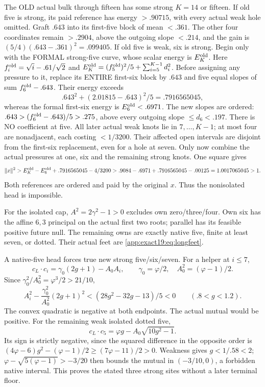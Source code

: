 The OLD actual bulk through fifteen
has some strong \(K=14\) or fifteen.
If old five is strong, its paid
reference has energy \(>.90715\),
with every actual weak hole omitted.
Graft
\(.643\) into its first-five block
of mean \(<.361\).
The other four coordinates remain
\(>.2904\), above the outgoing
slope \(<.214\), and the gain is
\((5/4)(.643-.361)^2=.099405\).
If old five is weak, six is strong.
Begin only with the FORMAL
strong-five curve, whose scalar
energy is \(E_K^{\rm old}\).
Here \(f_i^{\rm old}=\sqrt i-.61/\sqrt2\)
and \(E_K^{\rm old}=(f_5^{\rm old})^2/5
+\sum_{i=5}^{K-1}d_i^2\).
Before assigning any pressure to
it, replace its ENTIRE first-six
block by \(.643\) and five equal
slopes of sum \(f_6^{\rm old}-.643\).
Their energy exceeds
\[
 .643^2+(2.01815-.643)^2/5=.7916565045 ,
\]
whereas the formal first-six
energy is \(E_6^{\rm old}<.6971\).
The new slopes are ordered:
\(.643>(f_6^{\rm old}-.643)/5>.275\),
above every outgoing slope
\(\le d_6<.197\).
There is NO coefficient at five.
All later actual weak knots lie
in \(7,\ldots,K-1\); at most four
are nonadjacent, each costing
\(<1/3200\).
Their affected open intervals
are disjoint from the first-six
replacement, even for a hole
at seven.
Only now combine the actual
pressures at one, six and the
remaining strong knots.
One square gives
\[
 \|x\|^2>
 E_K^{\rm old}-E_6^{\rm old}
      +.7916565045-4/3200
 >.9084-.6971+.7916565045-.00125
       =1.0017065045>1 .
\]
Both references are ordered and
paid by the original \(x\).
Thus the nonisolated head is
impossible.

For the isolated cap,
\(A^2=2\gamma^2-1>0\) excludes
own zero/three/four.
Own six has the affine \(6,3\)
principal on the actual first two
roots; parallel has its feasible
positive future null.
The remaining owns are exactly
native five, finite at least seven,
or dotted.
Their actual feet are
\eqref{app:exact19:eq:longfeet}.

A native-five head forces true
new strong five/six/seven.
For a helper at \(i\le7\),
\[
 c_L\cdot c_i=\gamma_0(2g+1)-A_0A_i,\qquad
       \gamma_0=\varphi/2,\quad A_0^2=(\varphi-1)/2 .
\]
Since \(\gamma_0^2/A_0^2=\varphi^3/2>21/10\),
\[
 A_i^2-\frac{\gamma_0^2}{A_0^2}(2g+1)^2
                   <(28g^2-32g-13)/5<0
                  \qquad(.8<g<1.2).
\]
The convex quadratic is negative
at both endpoints.
The actual mutual would be
positive.
For the remaining weak isolated
dotted five,
\[
 c_L\cdot c_5=\varphi g-A_0\sqrt{10g^2-1}.
\]
Its sign is strictly negative,
since the squared difference in
the opposite order is
\((4\varphi-6)g^2-(\varphi-1)/2
\ge(7\varphi-11)/2>0\).
Weakness gives \(g<1/.58<2\);
\(\varphi-\sqrt{5(\varphi-1)}>-3/20\)
then bounds the mutual in
\((-3/10,0)\), a forbidden native
interval.
This proves the stated three
strong sites without a later
terminal floor.

